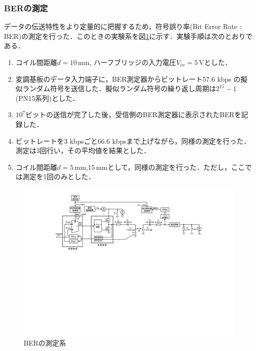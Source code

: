 \subsubsection{BERの測定}
データの伝送特性をより定量的に把握するため，符号誤り率(Bit Error Rate : BER)の測定を行った．このときの実験系を図\ref{ber}に示す．実験手順は次のとおりである．
\begin{enumerate} %
  \item コイル間距離$d =10 \, \mathrm{mm}$, ハーフブリッジの入力電圧$V_{in}=5 \, \mathrm{V}$とした．
  \item 変調基板のデータ入力端子に，BER測定器からビットレート57.6 kbps の擬似ランダム符号を送信した．擬似ランダム符号の繰り返し周期は$2^{15}-1$(PN15系列)とした．
  \item $10^7$ビットの送信が完了した後，受信側のBER測定器に表示されたBERを記録した．
  \item ビットレートを3 kbpsごと66.6 kbpsまで上げながら，同様の測定を行った．測定は3回行い，その平均値を結果とした．
  \item コイル間距離$d =5 \, \mathrm{mm}$,$15 \, \mathrm{mm}$として，同様の測定を行った．ただし，ここでは測定を1回のみとした．
  \end{enumerate}

\begin{figure}[h]
\begin{center}

\includegraphics[width=160mm]{figures/ber.pdf}
  \caption{BERの測定系}
  \label{ber}

  \end{center}
\end{figure}

